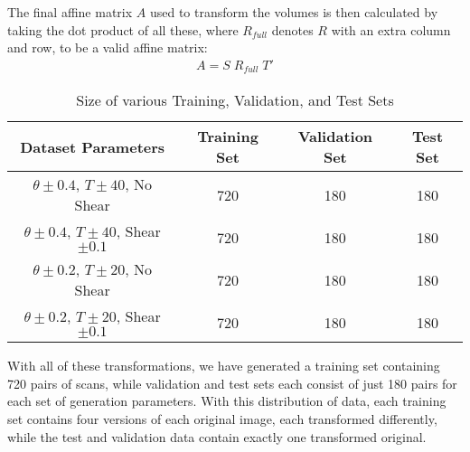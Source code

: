 The final affine matrix $A$ used to transform the volumes is then calculated by taking the dot product of all these, where $R_{full}$ denotes $R$ with an extra column and row, to be a valid affine matrix:
\begin{align*}
  A = S\;R_{full}\;T'
\end{align*}

\begin{table}[h!]
\centering
\begin{tabular}{c|ccc}
\hline
Dataset Parameters                          & Training Set & Validation Set & Test Set \\\hline
$\theta \pm 0.4$, $T \pm 40$, No Shear      & 720          & 180            & 180      \\
$\theta \pm 0.4$, $T \pm 40$, Shear$\pm0.1$ & 720          & 180            & 180      \\
$\theta \pm 0.2$, $T \pm 20$, No Shear      & 720          & 180            & 180      \\
$\theta \pm 0.2$, $T \pm 20$, Shear$\pm0.1$ & 720          & 180            & 180      \\\hline
\end{tabular}
\caption{Size of various Training, Validation, and Test Sets}
\label{table:data_sizes}
\end{table}

With all of these transformations, we have generated a training set containing 720 pairs of scans, while validation and test sets each consist of just 180 pairs for each set of generation parameters. With this distribution of data, each training set contains four versions of each original image, each transformed differently, while the test and validation data contain exactly one transformed original.



